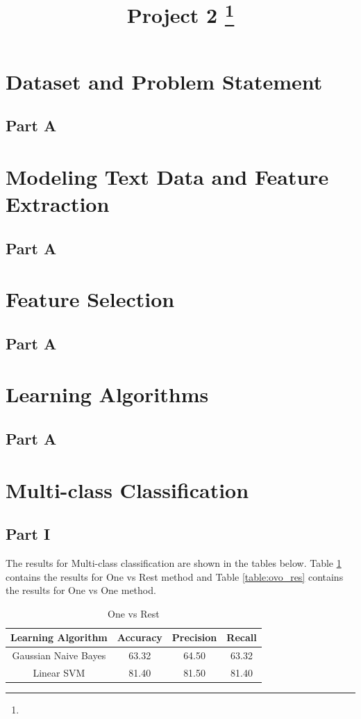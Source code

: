 \documentclass[11pt]{article}
\title{Project 2
\footnote{\s{EE 239AS ; Winter 2016 }
}
}
\begin{document}
\maketitle


\section{Dataset and Problem Statement}
\subsection{Part A}

\section{Modeling Text Data and Feature Extraction}
\subsection{Part A}

\section{Feature Selection}
\subsection{Part A}

\section{Learning Algorithms}
\subsection{Part A}

\section{Multi-class Classification}
\subsection{Part I}

The results for Multi-class classification are shown in the tables below. Table \ref{table:ovr_res} contains the results for One vs Rest method and Table \ref{table:ovo_res} contains the results for One vs One method.

\begin{table}[h]
	\centering
	\begin{tabular}{|c|c|c|c|} \hline
		Learning Algorithm & Accuracy & Precision & Recall\\ \hline
		Gaussian Naive Bayes & 63.32 & 64.50 & 63.32 \\
		Linear SVM & 81.40 & 81.50 & 81.40 \\
		\hline
		\end{tabular}
		\caption{One vs Rest}
		\label{table:ovr_res}
\end{table}
\end{document}
